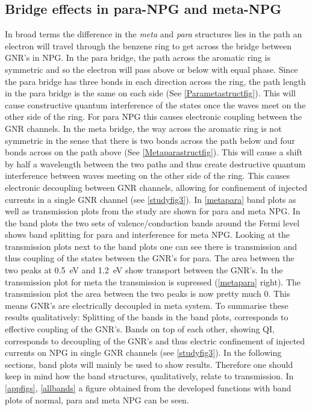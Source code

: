 \subsection{Bridge effects in para-NPG and meta-NPG}\label{metaparasection}
In broad terms the difference in the \textit{meta} and \textit{para} structures lies in the path an electron will travel through the benzene ring to get across the bridge between GNR's in NPG. In the para bridge, the path across the aromatic ring is symmetric and so the electron will pass above or below with equal phase. Since the para bridge has three bonds in each direction across the ring, the path length in the para bridge is the same on each side (See \cref{Parametastructfig}). This will cause constructive quantum interference of the states once the waves meet on the other side of the ring. For para NPG this causes electronic coupling between the GNR channels. In the meta bridge, the way across the aromatic ring is not symmetric in the sense that there is two bonds across the path below and four bonds across on the path above (See \cref{Metaparastructfig}). This will cause a shift by half a wavelength between the two paths and thus create destructive quantum interference between waves meeting on the other side of the ring. This causes electronic decoupling between GNR channels, allowing for confinement of injected currents in a single GNR channel\cite{unpub} (see \cref{studyfig3}). In \cref{metapara} band plots as well as transmission plots from the study\cite{unpub} are shown for para and meta NPG. In the band plots the two sets of valence/conduction bands around the Fermi level shows band splitting for para and interference for meta NPG. Looking at the transmission plots next to the band plots one can see there is transmission and thus coupling of the states between the GNR's for para. The area between the two peaks at \SI{0.5}{\electronvolt} and  \SI{1.2}{\electronvolt} show transport between the GNR's. In the transmission plot for meta the transmission is supressed (\cref{metapara} right). The transmission plot the area between the two peaks is now pretty much 0. This means GNR's are electrically decoupled in meta system. To summarise these results qualitatively: Splitting of the bands in the band plots, corresponds to effective coupling of the GNR's. Bands on top of each other, showing QI, corresponds to decoupling of the GNR's and thus electric confinement of injected currents on NPG in single GNR channels (see \cref{studyfig3}). In the following sections, band plots will mainly be used to show results. Therefore one should keep in mind how the band structures, qualitatively, relate to transmission. In \cref{appfigs}, \cref{allbands} a figure obtained from the developed functions with band plots of normal, para and meta NPG can be seen.
